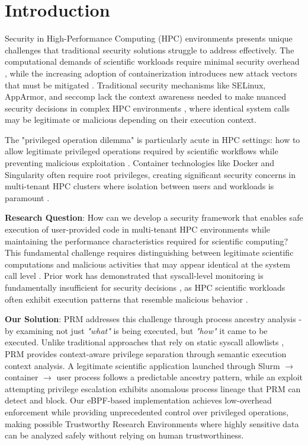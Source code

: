 \documentclass[conference]{IEEEtran}
\begin{document}
\section{Introduction}
Security in High-Performance Computing (HPC) environments presents unique challenges that traditional security solutions struggle to address effectively. The computational demands of scientific workloads require minimal security overhead \cite{zhang2021analyzing,xavier2013performance}, while the increasing adoption of containerization introduces new attack vectors that must be mitigated \cite{reshetova2016security,rudyy2018containers}. Traditional security mechanisms like SELinux, AppArmor, and seccomp lack the context awareness needed to make nuanced security decisions in complex HPC environments \cite{provos2003improving,li2018speaker}, where identical system calls may be legitimate or malicious depending on their execution context.

The "privileged operation dilemma" is particularly acute in HPC settings: how to allow legitimate privileged operations required by scientific workflows while preventing malicious exploitation \cite{kurtzer2017singularity,priedhorsky2017charliecloud}. Container technologies like Docker and Singularity often require root privileges, creating significant security concerns in multi-tenant HPC clusters where isolation between users and workloads is paramount \cite{canon2016scream,torrez2019hpc}.

\textbf{Research Question}: How can we develop a security framework that enables safe execution of user-provided code in multi-tenant HPC environments while maintaining the performance characteristics required for scientific computing? This fundamental challenge requires distinguishing between legitimate scientific computations and malicious activities that may appear identical at the system call level \cite{pappas2013kbouncer,ghavamnia2020confine}. Prior work has demonstrated that syscall-level monitoring is fundamentally insufficient for security decisions \cite{wang2021semantic}, as HPC scientific workloads often exhibit execution patterns that resemble malicious behavior \cite{vasilakis2019hpc}.

\textbf{Our Solution}: PRM addresses this challenge through process ancestry analysis - by examining not just \textit{"what"} is being executed, but \textit{"how"} it came to be executed. Unlike traditional approaches that rely on static syscall allowlists \cite{ghavamnia2020confine}, PRM provides context-aware privilege separation \cite{ghavamnia2020confine} through semantic execution context analysis. A legitimate scientific application launched through Slurm $\rightarrow$ container $\rightarrow$ user process follows a predictable ancestry pattern, while an exploit attempting privilege escalation exhibits anomalous process lineage that PRM can detect and block. Our eBPF-based implementation achieves low-overhead enforcement \cite{nelson2020ebpf} while providing unprecedented control over privileged operations, making possible Trustworthy Research Environments where highly sensitive data can be analyzed safely without relying on human trustworthiness.
\end{document}
